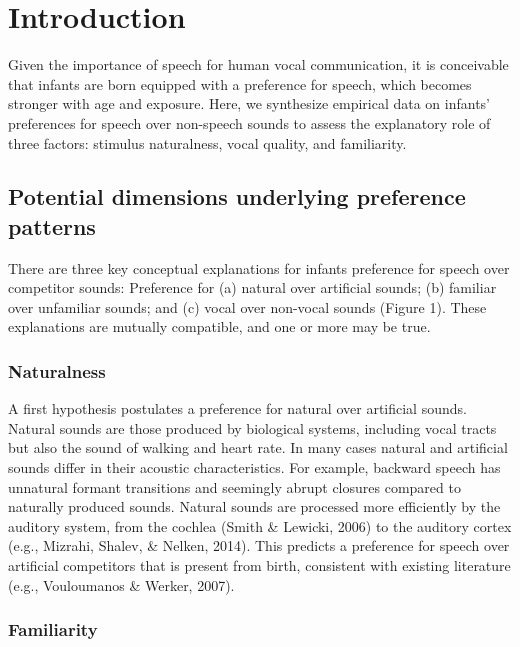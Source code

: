 \documentclass[man]{apa6}
\begin{document}
\section{Introduction}\label{introduction}

Given the importance of speech for human vocal communication, it is
conceivable that infants are born equipped with a preference for speech,
which becomes stronger with age and exposure. Here, we synthesize
empirical data on infants' preferences for speech over non-speech sounds
to assess the explanatory role of three factors: stimulus naturalness,
vocal quality, and familiarity.

\subsection{Potential dimensions underlying preference
patterns}\label{potential-dimensions-underlying-preference-patterns}

There are three key conceptual explanations for infants preference for
speech over competitor sounds: Preference for (a) natural over
artificial sounds; (b) familiar over unfamiliar sounds; and (c) vocal
over non-vocal sounds (Figure 1). These explanations are mutually
compatible, and one or more may be true.

\subsubsection{Naturalness}\label{naturalness}

A first hypothesis postulates a preference for natural over artificial
sounds. Natural sounds are those produced by biological systems,
including vocal tracts but also the sound of walking and heart rate. In
many cases natural and artificial sounds differ in their acoustic
characteristics. For example, backward speech has unnatural formant
transitions and seemingly abrupt closures compared to naturally produced
sounds. Natural sounds are processed more efficiently by the auditory
system, from the cochlea (Smith \& Lewicki, 2006) to the auditory cortex
(e.g., Mizrahi, Shalev, \& Nelken, 2014). This predicts a preference for
speech over artificial competitors that is present from birth,
consistent with existing literature (e.g., Vouloumanos \& Werker, 2007).

\subsubsection{Familiarity}\label{familiarity}
\end{document}
